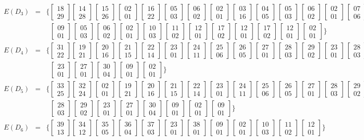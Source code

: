 \[\begin{array}{rcl}
E(D_3) &=& \{ \begin{bmatrix} 18 \\ 29 \end{bmatrix} \begin{bmatrix} 14 \\ 28 \end{bmatrix}\,\begin{bmatrix} 15 \\ 26 \end{bmatrix}\,\begin{bmatrix} 02 \\ 01 \end{bmatrix}\,\begin{bmatrix} 16 \\ 22 \end{bmatrix}\,\begin{bmatrix} 05 \\ 03 \end{bmatrix}\,\begin{bmatrix} 06 \\ 02 \end{bmatrix}\,\begin{bmatrix} 02 \\ 01 \end{bmatrix}\,\begin{bmatrix} 03 \\ 16 \end{bmatrix}\,\begin{bmatrix} 04 \\ 05 \end{bmatrix}\,\begin{bmatrix} 05 \\ 03 \end{bmatrix}\,\begin{bmatrix} 06 \\ 02 \end{bmatrix}\,\begin{bmatrix} 02 \\ 01 \end{bmatrix}\,\begin{bmatrix} 07 \\ 06 \end{bmatrix}\,\begin{bmatrix} 08 \\ 05 \end{bmatrix}\,\\[1em] & & \;\;\begin{bmatrix} 09 \\ 01 \end{bmatrix}\,\begin{bmatrix} 05 \\ 03 \end{bmatrix}\,\begin{bmatrix} 06 \\ 02 \end{bmatrix}\,\begin{bmatrix} 02 \\ 01 \end{bmatrix}\,\begin{bmatrix} 10 \\ 03 \end{bmatrix}\,\begin{bmatrix} 11 \\ 02 \end{bmatrix}\,\begin{bmatrix} 12 \\ 01 \end{bmatrix}\,\begin{bmatrix} 17 \\ 02 \end{bmatrix}\,\begin{bmatrix} 12 \\ 01 \end{bmatrix}\,\begin{bmatrix} 17 \\ 02 \end{bmatrix}\,\begin{bmatrix} 12 \\ 01 \end{bmatrix}\,\begin{bmatrix} 02 \\ 01 \end{bmatrix} \} \\[1.8em]
E(D_4) &=& \{ \begin{bmatrix} 31 \\ 22 \end{bmatrix} \begin{bmatrix} 19 \\ 21 \end{bmatrix}\,\begin{bmatrix} 20 \\ 16 \end{bmatrix}\,\begin{bmatrix} 21 \\ 15 \end{bmatrix}\,\begin{bmatrix} 22 \\ 14 \end{bmatrix}\,\begin{bmatrix} 23 \\ 01 \end{bmatrix}\,\begin{bmatrix} 24 \\ 11 \end{bmatrix}\,\begin{bmatrix} 25 \\ 06 \end{bmatrix}\,\begin{bmatrix} 26 \\ 05 \end{bmatrix}\,\begin{bmatrix} 27 \\ 01 \end{bmatrix}\,\begin{bmatrix} 28 \\ 03 \end{bmatrix}\,\begin{bmatrix} 29 \\ 02 \end{bmatrix}\,\begin{bmatrix} 23 \\ 01 \end{bmatrix}\,\begin{bmatrix} 28 \\ 03 \end{bmatrix}\,\begin{bmatrix} 29 \\ 02 \end{bmatrix}\,\\[1em] & & \;\;\begin{bmatrix} 23 \\ 01 \end{bmatrix}\,\begin{bmatrix} 27 \\ 01 \end{bmatrix}\,\begin{bmatrix} 30 \\ 04 \end{bmatrix}\,\begin{bmatrix} 09 \\ 01 \end{bmatrix}\,\begin{bmatrix} 02 \\ 01 \end{bmatrix} \} \\[1.8em]
E(D_5) &=& \{ \begin{bmatrix} 33 \\ 25 \end{bmatrix} \begin{bmatrix} 32 \\ 24 \end{bmatrix}\,\begin{bmatrix} 02 \\ 01 \end{bmatrix}\,\begin{bmatrix} 19 \\ 21 \end{bmatrix}\,\begin{bmatrix} 20 \\ 16 \end{bmatrix}\,\begin{bmatrix} 21 \\ 15 \end{bmatrix}\,\begin{bmatrix} 22 \\ 14 \end{bmatrix}\,\begin{bmatrix} 23 \\ 01 \end{bmatrix}\,\begin{bmatrix} 24 \\ 11 \end{bmatrix}\,\begin{bmatrix} 25 \\ 06 \end{bmatrix}\,\begin{bmatrix} 26 \\ 05 \end{bmatrix}\,\begin{bmatrix} 27 \\ 01 \end{bmatrix}\,\begin{bmatrix} 28 \\ 03 \end{bmatrix}\,\begin{bmatrix} 29 \\ 02 \end{bmatrix}\,\begin{bmatrix} 23 \\ 01 \end{bmatrix}\,\\[1em] & & \;\;\begin{bmatrix} 28 \\ 03 \end{bmatrix}\,\begin{bmatrix} 29 \\ 02 \end{bmatrix}\,\begin{bmatrix} 23 \\ 01 \end{bmatrix}\,\begin{bmatrix} 27 \\ 01 \end{bmatrix}\,\begin{bmatrix} 30 \\ 04 \end{bmatrix}\,\begin{bmatrix} 09 \\ 01 \end{bmatrix}\,\begin{bmatrix} 02 \\ 01 \end{bmatrix}\,\begin{bmatrix} 09 \\ 01 \end{bmatrix} \} \\[1.8em]
E(D_6) &=& \{ \begin{bmatrix} 39 \\ 13 \end{bmatrix} \begin{bmatrix} 34 \\ 12 \end{bmatrix}\,\begin{bmatrix} 35 \\ 05 \end{bmatrix}\,\begin{bmatrix} 36 \\ 04 \end{bmatrix}\,\begin{bmatrix} 37 \\ 03 \end{bmatrix}\,\begin{bmatrix} 23 \\ 01 \end{bmatrix}\,\begin{bmatrix} 38 \\ 01 \end{bmatrix}\,\begin{bmatrix} 09 \\ 01 \end{bmatrix}\,\begin{bmatrix} 02 \\ 01 \end{bmatrix}\,\begin{bmatrix} 10 \\ 03 \end{bmatrix}\,\begin{bmatrix} 11 \\ 02 \end{bmatrix}\,\begin{bmatrix} 12 \\ 01 \end{bmatrix} \} 
\end{array}\]
